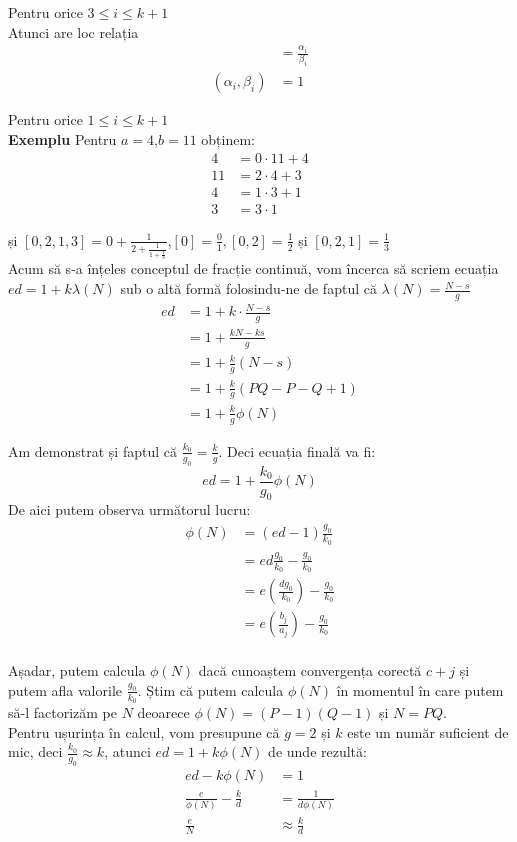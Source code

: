 \documentclass[12pt, oneside]{book}
\begin{document}
Pentru orice $3 \leq i \leq k+1$ \\
Atunci are loc relația
\begin{align*}
[q_1,q_2,\dots,q_i] &= \frac{\alpha_i}{\beta_i}\\
(\alpha_i,\beta_i)&=1
\end{align*} 

Pentru orice $1 \leq i \leq k+1$ \\
\textbf{Exemplu} Pentru $a=4$,$b=11$ obținem:\\
\begin{align*}
4&=0 \cdot 11+4\\
11&=2 \cdot 4+3\\
4&=1 \cdot 3+1\\
3&=3 \cdot 1
\end{align*}

și $[0,2,1,3]= 0 + \frac{1}{2+\frac{1}{1+\frac{1}{3}}}$,$[0]=\frac{0}{1},[0,2]=\frac{1}{2}$ și $[0,2,1]=\frac{1}{3}$  \\
Acum să s-a înțeles conceptul de fracție continuă, vom încerca să scriem  ecuația $ed=1+k\lambda(N)$ sub o altă formă folosindu-ne de faptul că $\lambda(N)= \frac{N-s}{g}$
\begin{align*}
 ed &= 1+k \cdot   \frac{N-s}{g} \\ 
 &= 1 + \frac{kN-ks}{g} \\
 &= 1+ \frac{k}{g}(N-s) \\ 
 &= 1 + \frac{k}{g} (PQ - P - Q +1)\\
 &= 1+\frac{k}{g}\phi(N)
\end{align*}

Am demonstrat și faptul că $\frac{k_0}{g_0} = \frac{k}{g}$. Deci ecuația finală va fi:
$$ ed=1+\frac{k_0}{g_0}\phi(N)$$
De aici putem observa următorul lucru:
\begin{align*}
\phi(N) &= (ed - 1 )\frac{g_0}{k_0}\\
&=ed \frac{g_0}{k_0} - \frac{g_0}{k_0} \\
 &= e \left(  \frac{dg_0}{k_0}  \right) - \frac{g_0}{k_0}\\ 
 &= e \left( \frac{b_j}{a_j}  \right) - \frac{g_0}{k_0} \\
\end{align*}

Așadar, putem calcula $\phi(N)$ dacă cunoaștem convergența corectă $c+j$ și putem afla valorile $\frac{g_0}{k_0}$. Știm că putem calcula $\phi(N)$ în momentul în care putem să-l factorizăm pe $N$ deoarece $\phi(N)=(P-1)(Q-1)$ și $N=PQ$. \\
Pentru ușurința în calcul, vom presupune că $g=2$ și $k$ este un număr suficient de mic, deci $\frac{k_0}{g_0} \approx k$, atunci $ed = 1+k\phi(N)$ de unde rezultă:
\begin{align*}
 ed-k\phi(N)&=1\\
 \frac{e}{\phi(N)} - \frac{k}{d} &= \frac{1}{d\phi(N)}\\ \frac{e}{N} &\approx \frac{k}{d} \\
\end{align*}
 
\end{document}
